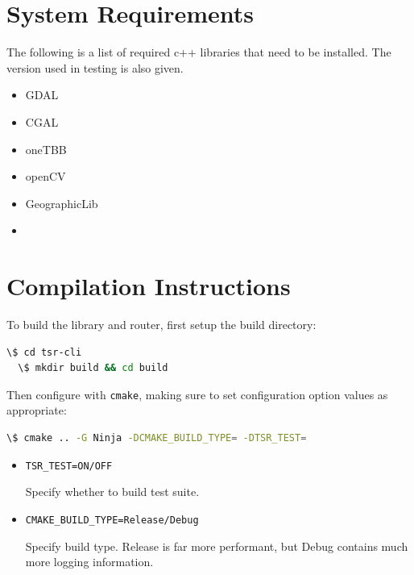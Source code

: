 \documentclass[12pt]{article}
\begin{document}
\pagebreak
\begin{appendices}

  \section{System Requirements}

  The following is a list of required c++ libraries that need to be installed. The version used in testing is also given.

  \begin{itemize}
    \item GDAL
    \item CGAL
    \item oneTBB
    \item openCV
    \item GeographicLib
    \item
  \end{itemize}

  \section{Compilation Instructions}

  To build the library and router, first setup the build directory:

  \begin{lstlisting}[language=bash]
  \$ cd tsr-cli
  \$ mkdir build && cd build
\end{lstlisting}

  \noindent Then configure with \texttt{cmake}, making sure to set configuration option values as appropriate:

  \begin{lstlisting}[language=bash]
  \$ cmake .. -G Ninja -DCMAKE_BUILD_TYPE= -DTSR_TEST=
\end{lstlisting}

  \vspace*{-2em}

  \begin{itemize}
    \item \texttt{TSR\_TEST=ON/OFF}

          Specify whether to build test suite.

    \item \texttt{CMAKE\_BUILD\_TYPE=Release/Debug}

          Specify build type. Release is far more performant, but Debug contains much more logging information.
  \end{itemize}



\end{appendices}
\end{document}
